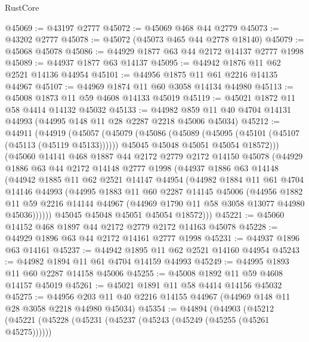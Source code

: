 \begin{lexlean}{RustCore}
\begin{coremodule}
@45069 := @43197 @2777
@45072 := @45069 @468 @44 @2779
@45073 := @43202 @2777
@45078 := @45072 (@45073 @465 @44 @2778 @18140)
@45079 := @45068 @45078
@45086 := @44929 @1877 @63 @44 @2172 @14137 @2777 @1998
@45089 := @44937 @1877 @63 @14137
@45095 := @44942 @1876 @11 @62 @2521 @14136 @44954
@45101 := @44956 @1875 @11 @61 @2216 @14135 @44967
@45107 := @44969 @1874 @11 @60 @3058 @14134 @44980
@45113 := @45008 @1873 @11 @59 @4608 @14133 @45019
@45119 := @45021 @1872 @11 @58 @4414 @14132 @45032
@45133 := @44982 @859 @11 @40 @4704 @14131 @44993 (@44995 @148 @11 @28 @2287 @2218 @45006 @45034)
@45212 := @44911
    (@44919
      (@45057
        (@45079
          (@45086
            (@45089 (@45095 (@45101 (@45107 (@45113 (@45119 @45133))))))
            @45045
            @45048
            @45051
            @45054
            @18572)))
      (@45060
        @14141
        @468
        @1887
        @44
        @2172
        @2779
        @2172
        @14150
        @45078
        (@44929
          @1886
          @63
          @44
          @2172
          @14148
          @2777
          @1998
          (@44937
            @1886
            @63
            @14148
            (@44942
              @1885
              @11
              @62
              @2521
              @14147
              @44954
              (@44982
                @1884
                @11
                @61
                @4704
                @14146
                @44993
                (@44995
                  @1883
                  @11
                  @60
                  @2287
                  @14145
                  @45006
                  (@44956
                    @1882
                    @11
                    @59
                    @2216
                    @14144
                    @44967
                    (@44969 @1790 @11 @58 @3058 @13077 @44980 @45036))))))
          @45045
          @45048
          @45051
          @45054
          @18572)))
@45221 := @45060 @14152 @468 @1897 @44 @2172 @2779 @2172 @14163 @45078
@45228 := @44929 @1896 @63 @44 @2172 @14161 @2777 @1998
@45231 := @44937 @1896 @63 @14161
@45237 := @44942 @1895 @11 @62 @2521 @14160 @44954
@45243 := @44982 @1894 @11 @61 @4704 @14159 @44993
@45249 := @44995 @1893 @11 @60 @2287 @14158 @45006
@45255 := @45008 @1892 @11 @59 @4608 @14157 @45019
@45261 := @45021 @1891 @11 @58 @4414 @14156 @45032
@45275 := @44956 @203 @11 @40 @2216 @14155 @44967 (@44969 @148 @11 @28 @3058 @2218 @44980 @45034)
@45354 := @44894
    (@44903
      (@45212
        (@45221
          (@45228
            (@45231 (@45237 (@45243 (@45249 (@45255 (@45261 @45275))))))

\end{coremodule}
\end{lexlean}
